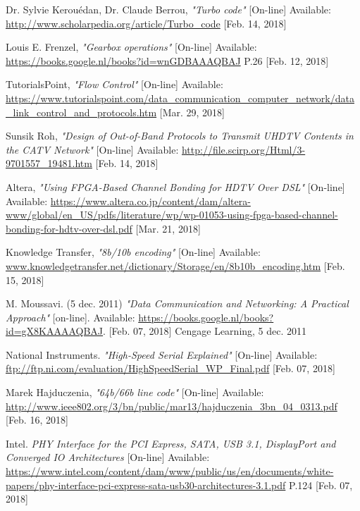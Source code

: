 \begin{thebibliography}{9}
	Dr. Sylvie Kerouédan, Dr. Claude Berrou,
	\textit{"Turbo code"}
	[On-line] Available:
	\url{http://www.scholarpedia.org/article/Turbo_code} [Feb. 14, 2018]
	
	Louis E. Frenzel,
	\textit{"Gearbox operations"}
	[On-line] Available:
	\url{https://books.google.nl/books?id=wnGDBAAAQBAJ}  P.26 [Feb. 12, 2018]

	TutorialsPoint,
	\textit{"Flow Control"}
	[On-line] Available:
	\url{https://www.tutorialspoint.com/data_communication_computer_network/data_link_control_and_protocols.htm} [Mar. 29, 2018]	

	Sunsik Roh,
	\textit{"Design of Out-of-Band Protocols to Transmit UHDTV Contents in the CATV Network"}
	[On-line] Available:
	\url{http://file.scirp.org/Html/3-9701557_19481.htm} [Feb. 14, 2018]

	Altera,
	\textit{"Using FPGA-Based Channel Bonding for HDTV Over DSL"}
	[On-line] Available:	
	\url{https://www.altera.co.jp/content/dam/altera-www/global/en_US/pdfs/literature/wp/wp-01053-using-fpga-based-channel-bonding-for-hdtv-over-dsl.pdf} [Mar. 21, 2018]

	Knowledge Transfer,
	\textit{"8b/10b encoding"}
	[On-line] Available:
	\url{www.knowledgetransfer.net/dictionary/Storage/en/8b10b_encoding.htm} [Feb. 15, 2018]
	
	M. Moussavi. (5 dec. 2011)
	\textit{"Data Communication and Networking: A Practical Approach"}
	[on-line]. Available: \url{https://books.google.nl/books?id=gX8KAAAAQBAJ}. [Feb. 07, 2018]
	Cengage Learning, 5 dec. 2011

	National Instruments.
	\textit{"High-Speed Serial Explained"}
	[On-line] Available: \url{ftp://ftp.ni.com/evaluation/HighSpeedSerial_WP_Final.pdf} [Feb. 07, 2018]

	Marek Hajduczenia,
	\textit{"64b/66b line code"}
	[On-line] Available:
	\url{http://www.ieee802.org/3/bn/public/mar13/hajduczenia_3bn_04_0313.pdf} [Feb. 16, 2018]
  
  Intel.
  \textit{PHY Interface for the PCI Express, SATA, USB 3.1, DisplayPort and Converged IO Architectures}
  [On-line] Available: \url{https://www.intel.com/content/dam/www/public/us/en/documents/white-papers/phy-interface-pci-express-sata-usb30-architectures-3.1.pdf} P.124 [Feb. 07, 2018]
  

\end{thebibliography}
